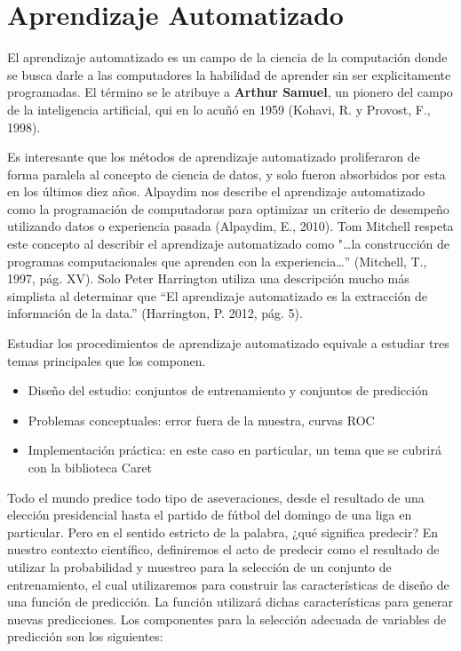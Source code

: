 \pagebreak
\section{Aprendizaje Automatizado}
El aprendizaje automatizado es un campo de la ciencia de la computación donde se busca darle a las computadores la habilidad de aprender sin ser explicitamente programadas. El término se le atribuye a \textbf{Arthur Samuel}, un pionero del campo de la inteligencia artificial, qui	en lo acuñó en 1959 (Kohavi, R. y Provost, F., 1998). 

Es interesante que los métodos de aprendizaje automatizado proliferaron de forma paralela al concepto de ciencia de datos, y solo fueron absorbidos por esta en los últimos diez años. Alpaydim nos describe el aprendizaje automatizado como la programación de computadoras para optimizar un criterio de desempeño utilizando datos o experiencia pasada (Alpaydim, E., 2010). Tom Mitchell respeta este concepto al describir el aprendizaje automatizado como "\ldots la construcción de programas computacionales que aprenden con la experiencia\ldots” (Mitchell, T., 1997, pág. XV). Solo Peter Harrington utiliza una descripción mucho más simplista al determinar que “El aprendizaje automatizado es la extracción de información de la data.” (Harrington, P. 2012, pág. 5). 

Estudiar los procedimientos de aprendizaje automatizado equivale a estudiar tres temas principales que los componen.

\begin{itemize}
	\item Diseño del estudio: conjuntos de entrenamiento y conjuntos de predicción
	\item Problemas conceptuales: error fuera de la muestra, curvas ROC
	\item Implementación práctica: en este caso en particular, un tema que se cubrirá con la biblioteca Caret
\end{itemize}

Todo el mundo predice todo tipo de aseveraciones, desde el resultado de una elección presidencial hasta el partido de fútbol del domingo de una liga en particular. Pero en el sentido estricto de la palabra, ¿qué significa predecir? En nuestro contexto científico, definiremos el acto de predecir como el resultado de utilizar la probabilidad y muestreo para la selección de un conjunto de entrenamiento, el cual utilizaremos para construir las características de diseño de una función de predicción. La función utilizará dichas características para generar nuevas predicciones.  Los componentes para la selección adecuada de variables de predicción son los siguientes:


